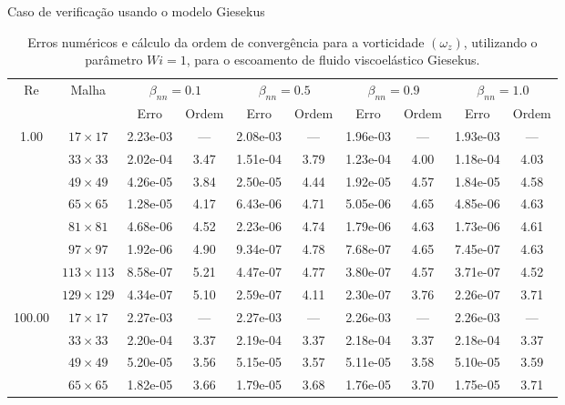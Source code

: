 \begin{frame}{Caso de verificação usando o modelo Giesekus}
    \centering
    \begin{table}[H]
\caption{Erros numéricos e cálculo da ordem de convergência para a vorticidade $(\omega_{z})$, utilizando o parâmetro $Wi=1$, para o escoamento de fluido viscoelástico Giesekus.\label{tab_GiesekusWzResumida_1}}
\scriptsize{
    \begin{tabular*}{\textwidth}{@{\extracolsep\fill}cccccccccc@{}}
    \hline
    \multirow{2}{*}{$\operatorname{Re}$} & \multirow{2}{*}{Malha} & \multicolumn{2}{c}{$\beta_{nn}=0.1$}  & \multicolumn{2}{c}{$\beta_{nn}=0.5$}  & \multicolumn{2}{c}{$\beta_{nn}=0.9$}  & \multicolumn{2}{c}{$\beta_{nn}=1.0$}\\ %
     & & Erro & Ordem & Erro & Ordem & Erro & Ordem & Erro & Ordem \\
    \hline
    \multirow{7}{*}{1.00} & $17\times 17$ & 2.23e-03 & --- & 2.08e-03 & --- & 1.96e-03 & --- & 1.93e-03 & --- \\
    & $33\times 33$ & 2.02e-04 & 3.47 & 1.51e-04 & 3.79 & 1.23e-04 & 4.00 & 1.18e-04 & 4.03 \\
    & $49\times 49$ & 4.26e-05 & 3.84 & 2.50e-05 & 4.44 & 1.92e-05 & 4.57 & 1.84e-05 & 4.58 \\
    & $65\times 65$ & 1.28e-05 & 4.17 & 6.43e-06 & 4.71 & 5.05e-06 & 4.65 & 4.85e-06 & 4.63 \\
    & $81\times 81$ & 4.68e-06 & 4.52 & 2.23e-06 & 4.74 & 1.79e-06 & 4.63 & 1.73e-06 & 4.61 \\
    & $97\times 97$ & 1.92e-06 & 4.90 & 9.34e-07 & 4.78 & 7.68e-07 & 4.65 & 7.45e-07 & 4.63 \\
    & $113\times 113$ & 8.58e-07 & 5.21 & 4.47e-07 & 4.77 & 3.80e-07 & 4.57 & 3.71e-07 & 4.52 \\
    & $129\times 129$ & 4.34e-07 & 5.10 & 2.59e-07 & 4.11 & 2.30e-07 & 3.76 & 2.26e-07 & 3.71 \\
    \hline
    \multirow{7}{*}{100.00} & $17\times 17$ & 2.27e-03 & --- & 2.27e-03 & --- & 2.26e-03 & --- & 2.26e-03 & --- \\
    & $33\times 33$ & 2.20e-04 & 3.37 & 2.19e-04 & 3.37 & 2.18e-04 & 3.37 & 2.18e-04 & 3.37 \\
    & $49\times 49$ & 5.20e-05 & 3.56 & 5.15e-05 & 3.57 & 5.11e-05 & 3.58 & 5.10e-05 & 3.59 \\
    & $65\times 65$ & 1.82e-05 & 3.66 & 1.79e-05 & 3.68 & 1.76e-05 & 3.70 & 1.75e-05 & 3.71 \\

\end{tabular*}}
\end{table}
\end{frame}
